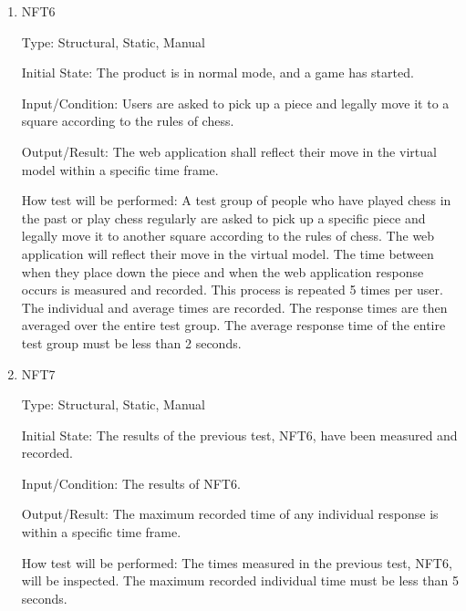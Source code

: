 \documentclass[12pt, titlepage]{article}
\begin{document}
\begin{enumerate}
    \item{NFT6}

        Type: Structural, Static, Manual
                            
        Initial State: The product is in normal mode, and a game has started.
                            
        Input/Condition: Users are asked to pick up a piece and legally move it to a square according to the rules of chess.
                            
        Output/Result: The web application shall reflect their move in the virtual model within a specific time frame.
                            
        How test will be performed: A test group of people who have played chess in the past or play chess regularly are asked to pick up a specific piece and 
            legally move it to another square according to the rules of chess. The web application will reflect their move in the virtual model. The time between 
            when they place down the piece and when the web application response occurs is measured and recorded. This process is repeated 5 times per user. The 
            individual and average times are recorded. The response times are then averaged over the entire test group. The average response time of the entire
            test group must be less than 2 seconds.

    \item{NFT7}

        Type: Structural, Static, Manual
                                
        Initial State: The results of the previous test, NFT6, have been measured and recorded.
                            
        Input/Condition: The results of NFT6.
                            
        Output/Result: The maximum recorded time of any individual response is within a specific time frame.
                            
        How test will be performed: The times measured in the previous test, NFT6, will be inspected. The maximum recorded individual time must be less than 
            5 seconds.
\end{enumerate}
\end{document}

